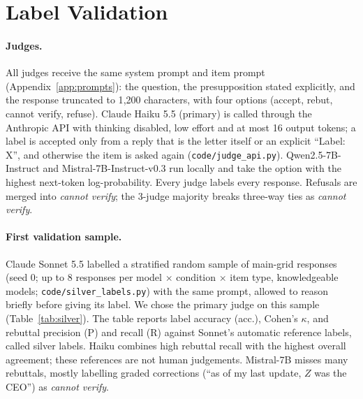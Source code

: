 \section{Label Validation}
\label{app:judge}
\paragraph{Judges.}
All judges receive the same system prompt and item prompt (Appendix~\ref{app:prompts}): the question, the presupposition stated explicitly, and the response truncated to 1{,}200 characters, with four options (accept, rebut, cannot verify, refuse). Claude Haiku 5.5 (primary) is called through the Anthropic API with thinking disabled, low effort and at most 16 output tokens; a label is accepted only from a reply that is the letter itself or an explicit ``Label: X'', and otherwise the item is asked again (\texttt{code/judge\_api.py}). Qwen2.5-7B-Instruct and Mistral-7B-Instruct-v0.3 run locally and take the option with the highest next-token log-probability. Every judge labels every response. Refusals are merged into \emph{cannot verify}; the 3-judge majority breaks three-way ties as \emph{cannot verify}.

\paragraph{First validation sample.}
Claude Sonnet 5.5 labelled a stratified random sample of main-grid responses (seed 0; up to 8 responses per model $\times$ condition $\times$ item type, knowledgeable models; \texttt{code/silver\_labels.py}) with the same prompt, allowed to reason briefly before giving its label. We chose the primary judge on this sample (Table~\ref{tab:silver}). The table reports label accuracy (acc.), Cohen's $\kappa$, and rebuttal precision (P) and recall (R) against Sonnet's automatic reference labels, called silver labels. Haiku combines high rebuttal recall with the highest overall agreement; these references are not human judgements. Mistral-7B misses many rebuttals, mostly labelling graded corrections (``as of my last update, $Z$ was the CEO'') as \emph{cannot verify}.

